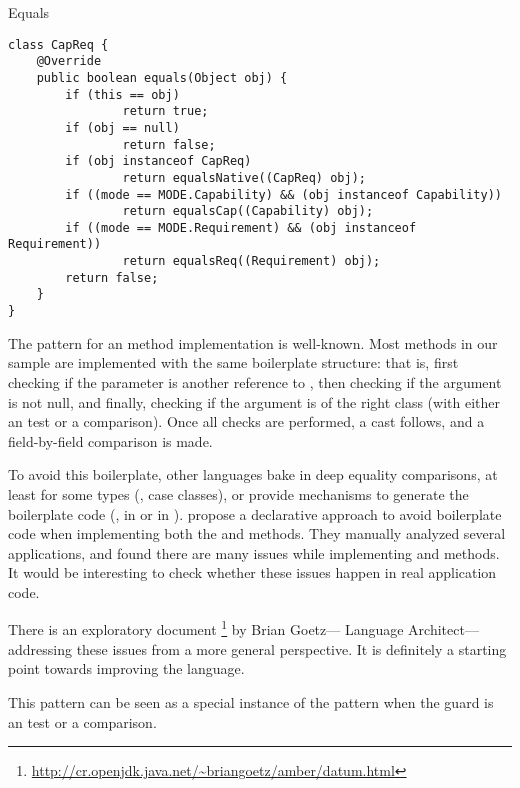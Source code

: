 \begin{pattern}{Equals}
\begin{verbatim}
class CapReq {
    @Override
    public boolean equals(Object obj) {
        if (this == obj)
                return true;
        if (obj == null)
                return false;
        if (obj instanceof CapReq)
                return equalsNative((CapReq) obj);
        if ((mode == MODE.Capability) && (obj instanceof Capability))
                return equalsCap((Capability) obj);
        if ((mode == MODE.Requirement) && (obj instanceof Requirement))
                return equalsReq((Requirement) obj);
        return false;
    }
}
\end{verbatim}


\discussion{}
The pattern for an  method implementation is well-known.
Most  methods in our sample are implemented with the same boilerplate structure:
that is, first checking if the parameter is another reference to ,
then checking if the argument is not null,
and finally, checking if the argument is of the right class
(with either an  test or a  comparison).
Once all checks are performed, a cast follows, and a field-by-field comparison is made.

To avoid this boilerplate, other languages bake in deep equality comparisons,
at least for some types (\eg, \scala{} case classes),
or provide mechanisms to generate the boilerplate code (\eg, 
in \haskell{} or \code{\#[derive(Eq)]} in \rust{}).
\cite{vaziriDeclarativeObjectIdentity2007} propose a declarative approach to avoid boilerplate code when implementing
both the  and  methods.
They manually analyzed several applications, and found there are many issues while implementing  and  methods.
It would be interesting to check whether these issues happen in real application code.

There is an exploratory document%
\footnote{\url{http://cr.openjdk.java.net/\~briangoetz/amber/datum.html}}
by Brian Goetz---\java{} Language Architect---addressing these issues from a more general perspective.
It is definitely a starting point towards improving the \java{} language.

This pattern can be seen as a special instance of the  pattern when the guard is an  test or a  comparison.

\end{pattern}